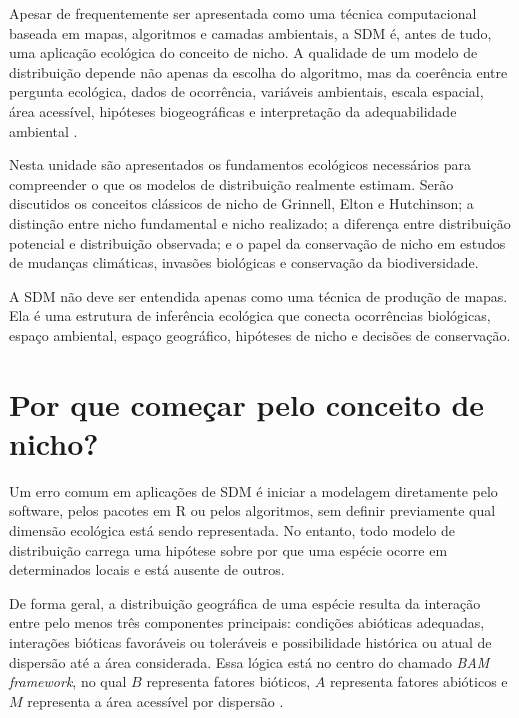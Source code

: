 \documentclass{ueap-sdm}
\begin{document}
Apesar de frequentemente ser apresentada como uma técnica computacional baseada em mapas, algoritmos e camadas ambientais, a SDM é, antes de tudo, uma aplicação ecológica do conceito de nicho. A qualidade de um modelo de distribuição depende não apenas da escolha do algoritmo, mas da coerência entre pergunta ecológica, dados de ocorrência, variáveis ambientais, escala espacial, área acessível, hipóteses biogeográficas e interpretação da adequabilidade ambiental \parencite{peterson2011,guisan2017habitat,barve2011crucial}.

Nesta unidade são apresentados os fundamentos ecológicos necessários para compreender o que os modelos de distribuição realmente estimam. Serão discutidos os conceitos clássicos de nicho de Grinnell, Elton e Hutchinson; a distinção entre nicho fundamental e nicho realizado; a diferença entre distribuição potencial e distribuição observada; e o papel da conservação de nicho em estudos de mudanças climáticas, invasões biológicas e conservação da biodiversidade.

\begin{conceito}
A SDM não deve ser entendida apenas como uma técnica de produção de mapas. Ela é uma estrutura de inferência ecológica que conecta ocorrências biológicas, espaço ambiental, espaço geográfico, hipóteses de nicho e decisões de conservação.
\end{conceito}

\section{Por que começar pelo conceito de nicho?}

Um erro comum em aplicações de SDM é iniciar a modelagem diretamente pelo software, pelos pacotes em R ou pelos algoritmos, sem definir previamente qual dimensão ecológica está sendo representada. No entanto, todo modelo de distribuição carrega uma hipótese sobre por que uma espécie ocorre em determinados locais e está ausente de outros.

De forma geral, a distribuição geográfica de uma espécie resulta da interação entre pelo menos três componentes principais: condições abióticas adequadas, interações bióticas favoráveis ou toleráveis e possibilidade histórica ou atual de dispersão até a área considerada. Essa lógica está no centro do chamado \textit{BAM framework}, no qual $B$ representa fatores bióticos, $A$ representa fatores abióticos e $M$ representa a área acessível por dispersão \parencite{soberon2005,soberon2009,barve2011crucial}.
\end{document}
